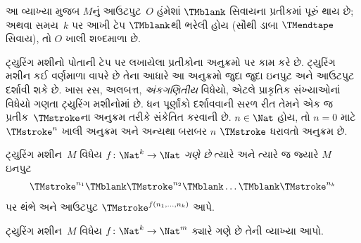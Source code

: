 \begin{explain}
આ વ્યાખ્યા મુજબ $M$નું આઉટપુટ~$O$ હંમેશાં
$\TMblank$ સિવાયના પ્રતીકમાં પૂરું થાય છે; અથવા
સમય~$k$ પર આખી ટેપ $\TMblank$થી ભરેલી હોય
(સૌથી ડાબા $\TMendtape$ સિવાય), તો $O$ ખાલી
શબ્દમાળા છે.
\end{explain}
\endgroup


\begingroup
\makeatletter{}\makeatother

\label{guunit:OLP-0258}


\begin{explain}
ટ્યુરિંગ મશીનો પોતાની ટેપ પર લખાયેલા પ્રતીકોના અનુક્રમો
પર કામ કરે છે. ટ્યુરિંગ મશીન કઈ વર્ણમાળા વાપરે છે તેના
આધારે આ અનુક્રમો જુદા જુદા ઇનપુટ અને આઉટપુટ દર્શાવી
શકે છે. ખાસ રસ, અલબત્ત, \emph{અંકગણિતીય} વિધેયો,
એટલે પ્રાકૃતિક સંખ્યાઓનાં વિધેયો ગણતા ટ્યુરિંગ મશીનોમાં
છે. ધન પૂર્ણાંકો દર્શાવવાની સરળ રીત તેમને એક જ
પ્રતીક~$\TMstroke$ના અનુક્રમ તરીકે સંકેતિત કરવાની છે.
$n \in \Nat$ હોય, તો $n = 0$ માટે $\TMstroke^n$
ખાલી અનુક્રમ અને અન્યથા બરાબર $n$ $\TMstroke$ ધરાવતો
અનુક્રમ છે.
\end{explain}

\begin{defn}[સંગણના]
ટ્યુરિંગ મશીન~$M$ વિધેય $f\colon \Nat^k \to \Nat$
\emph{ગણે છે} ત્યારે અને ત્યારે જ જ્યારે $M$ ઇનપુટ
\[
\TMstroke^{n_1} \TMblank \TMstroke^{n_2} \TMblank \dots \TMblank \TMstroke^{n_k}
\]
પર થંભે અને આઉટપુટ $\TMstroke^{f(n_1, \dots, n_k)}$
આપે.
\end{defn}

\begin{prob}
  ટ્યુરિંગ મશીન~$M$ વિધેય $f\colon \Nat^k \to \Nat^m$
  ક્યારે ગણે છે તેની વ્યાખ્યા આપો.
\end{prob}

